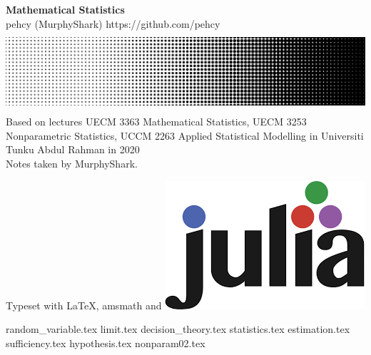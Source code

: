 \documentclass[11pt,twoside]{report}
\begin{document}
\begin{titlepage}
  \centering
  \vfill
  {\Large
      \textbf{Mathematical Statistics}\\
      \vskip2cm
      pehcy (MurphyShark) \quad \textsf{https://github.com/pehcy} \\
  }    
  \vfill
  \includegraphics[width=0.8\paperwidth, height=3cm]{./src/images/HalftoneGradient.png} %
  \vskip2cm
  {
    Based on lectures UECM 3363 Mathematical Statistics, UECM 3253 Nonparametric Statistics, UCCM 2263 Applied Statistical Modelling in Universiti Tunku Abdul Rahman in 2020\\
    Notes taken by MurphyShark.
  }
  \vfill
  \begin{flushleft}
    \footnotesize Typeset with \LaTeX, amsmath and \includegraphics[scale=0.06, height=3ex]{./src/images/Julia.png}
  \end{flushleft}
\end{titlepage}
{random_variable.tex}
{limit.tex}
{decision_theory.tex}
{statistics.tex}
{estimation.tex}
{sufficiency.tex}
{hypothesis.tex}
{nonparam02.tex}
\end{document}
